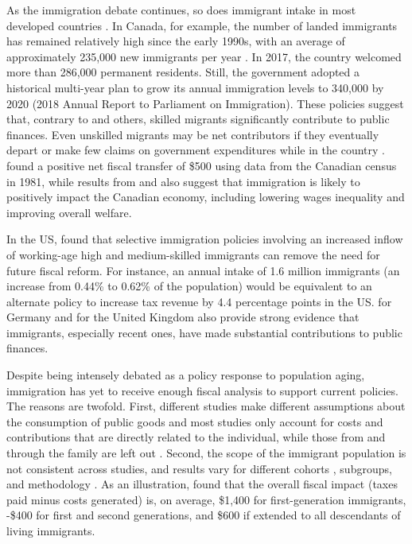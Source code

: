 \vspace{0.7em}\par
As the immigration debate continues, so does immigrant intake in most developed countries \citep{cardReviewImmigrationEconomics2016}.
In Canada, for example, the number of landed immigrants has remained relatively high since the early 1990s, with an average of approximately 235,000 new immigrants per year \citep{StatistiqueCanada:2016ud}.
In 2017, the country welcomed more than 286,000 permanent residents. Still, the government adopted a historical multi-year plan to grow its annual immigration levels to 340,000 by 2020 (2018 Annual Report to Parliament on Immigration).
These policies suggest that, contrary to \citet{Borjas:2014hr} and others, skilled migrants significantly contribute to public finances. Even unskilled migrants may be net contributors if they eventually depart or make few claims on government expenditures while in the country \citep{Rowthorn:2008kk}.
\citet{Akbari:1989fh} found a positive net fiscal transfer of \$500 using data from the Canadian census in 1981, while results from \citet{Ileri:2019hf} and \citet{dunganMacroeconomicImpactsCanadian2013} also suggest that immigration is likely to positively impact the Canadian economy, including lowering wages inequality and improving overall welfare.

\vspace{0.7em}\par
In the US, \citet{Storesletten:2000cn} found that selective immigration policies involving an increased inflow of working-age high and medium-skilled immigrants can remove the need for future fiscal reform.
For instance, an annual intake of 1.6 million immigrants (an increase from 0.44\% to 0.62\% of the population) would be equivalent to an alternate policy to increase tax revenue by 4.4 percentage points in the US.
\citet{Akin:2012gh} for Germany and \citet{Dustmann:2014dr} for the United Kingdom also provide strong evidence that immigrants, especially recent ones, have made substantial contributions to public finances.

\vspace{0.7em}\par
Despite being intensely debated as a policy response to population aging, immigration has yet to receive enough fiscal analysis to support current policies.
The reasons are twofold.
First, different studies make different assumptions about the consumption of public goods \citep{grubelFiscalTransfersImmigrants2012} and most studies only account for costs and contributions that are directly related to the individual, while those from and through the family are left out \citep{dAlbis:2019de}.
Second, the scope of the immigrant population is not consistent across studies, and results vary for different cohorts \citep{grubelFiscalTransfersImmigrants2012}, subgroups, and methodology \citep{Chojnicki:2011vu}.
As an illustration, \citet{Lee:1998fs} found that the overall fiscal impact (taxes paid minus costs generated) is, on average, \$1,400 for first-generation immigrants, -\$400 for first and second generations, and \$600 if extended to all descendants of living immigrants.

